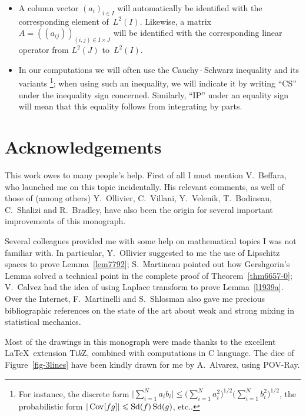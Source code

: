 \begin{itemize}
—this limit always exists.
%
\item A column vector $(a_i)_{i\in I}$ will automatically be identified with
the corresponding element of~$L^2(I)$.
Likewise, a matrix $A = (\!(a_{ij})\!)_{(i,j)\in I\times J}$ will be identified
with the corresponding linear operator from $L^2(J)$ to~$L^2(I)$.
%
\item In our computations we will often use the Cauchy\,-\,Schwarz inequality
and its variants%
\footnote{For instance, the discrete form $\big|\sum_{i=1}^N a_ib_i\big|
\leq \big(\sum_{i=1}^N a_i^2\big)^{1/2}\big(\sum_{i=1}^N b_i^2\big)^{1/2}$,
the probabilistic form $|\operatorname{Cov}[fg]| \leqslant \operatorname{Sd}(f)\operatorname{Sd}(g)$, etc..};
when using such an inequality,
we will indicate it by writing ``CS'' under the inequality sign concerned.
Similarly, ``IP'' under an equality sign will mean
that this equality follows from integrating by parts.
\end{itemize}




\section*{Acknowledgements}

This work owes to many people's help.
First of all I must mention V.~Beffara, who launched me on this topic incidentally.
His relevant comments, as well of those of (among others)
Y.~Ollivier, C.~Villani, Y.~Velenik, T.~Bodineau, C.~Shalizi and R.~Bradley,
have also been the origin for several important improvements of this monograph.

Several colleagues provided me with some help on mathematical topics
I was not familiar with. In particular,
Y.~Ollivier suggested to me the use of Lipschitz spaces to prove Lemma~\ref{lem7792};
S.~Martineau pointed out how Gershgorin's Lemma solved a technical point
in the complete proof of Theorem~\ref{thm6657-0};
V.~Calvez had the idea of using Laplace transform to prove Lemma~\ref{l1939a}.
Over the Internet, F.~Martinelli and S.~Shlosman also gave me
precious bibliographic references on the state of the art
about weak and strong mixing in statistical mechanics.

Most of the drawings in this monograph were made thanks to the excellent \LaTeX\ extension \hbox{Ti\textit{k}Z}, combined with computations in C language. The dice of Figure~\ref{fig-3lines} have been kindly drawn for me by A.~Alvarez, using POV-Ray.

